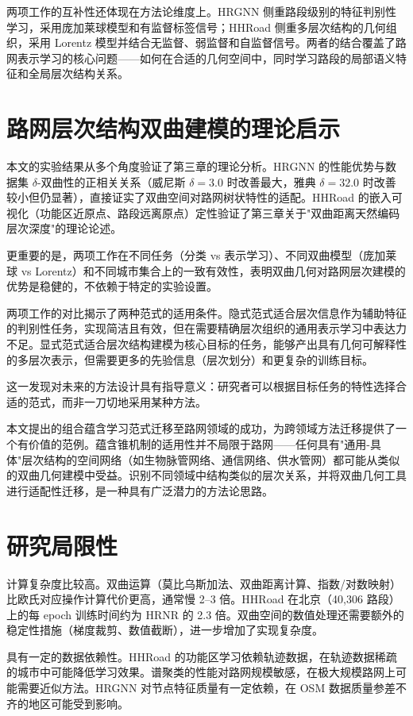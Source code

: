 两项工作的互补性还体现在方法论维度上。HRGNN 侧重路段级别的特征判别性学习，采用庞加莱球模型和有监督标签信号；HHRoad 侧重多层次结构的几何组织，采用 Lorentz 模型并结合无监督、弱监督和自监督信号。两者的结合覆盖了路网表示学习的核心问题——如何在合适的几何空间中，同时学习路段的局部语义特征和全局层次结构关系。

\section{路网层次结构双曲建模的理论启示}

本文的实验结果从多个角度验证了第三章的理论分析。HRGNN 的性能优势与数据集 $\delta$-双曲性的正相关关系（威尼斯 $\delta=3.0$ 时改善最大，雅典 $\delta=32.0$ 时改善较小但仍显著），直接证实了双曲空间对路网树状特性的适配。HHRoad 的嵌入可视化（功能区近原点、路段远离原点）定性验证了第三章关于"双曲距离天然编码层次深度"的理论论述。

更重要的是，两项工作在不同任务（分类 vs 表示学习）、不同双曲模型（庞加莱球 vs Lorentz）和不同城市集合上的一致有效性，表明双曲几何对路网层次建模的优势是稳健的，不依赖于特定的实验设置。

两项工作的对比揭示了两种范式的适用条件。隐式范式适合层次信息作为辅助特征的判别性任务，实现简洁且有效，但在需要精确层次组织的通用表示学习中表达力不足。显式范式适合层次结构建模为核心目标的任务，能够产出具有几何可解释性的多层次表示，但需要更多的先验信息（层次划分）和更复杂的训练目标。

这一发现对未来的方法设计具有指导意义：研究者可以根据目标任务的特性选择合适的范式，而非一刀切地采用某种方法。

本文提出的组合蕴含学习范式迁移至路网领域的成功，为跨领域方法迁移提供了一个有价值的范例。蕴含锥机制的适用性并不局限于路网——任何具有"通用-具体"层次结构的空间网络（如生物脉管网络、通信网络、供水管网）都可能从类似的双曲几何建模中受益。识别不同领域中结构类似的层次关系，并将双曲几何工具进行适配性迁移，是一种具有广泛潜力的方法论思路。

\section{研究局限性}

计算复杂度比较高。双曲运算（莫比乌斯加法、双曲距离计算、指数/对数映射）比欧氏对应操作计算代价更高，通常慢 2--3 倍。HHRoad 在北京（40,306 路段）上的每 epoch 训练时间约为 HRNR 的 2.3 倍。双曲空间的数值处理还需要额外的稳定性措施（梯度裁剪、数值截断），进一步增加了实现复杂度。

具有一定的数据依赖性。HHRoad 的功能区学习依赖轨迹数据，在轨迹数据稀疏的城市中可能降低学习效果。谱聚类的性能对路网规模敏感，在极大规模路网上可能需要近似方法。HRGNN 对节点特征质量有一定依赖，在 OSM 数据质量参差不齐的地区可能受到影响。

